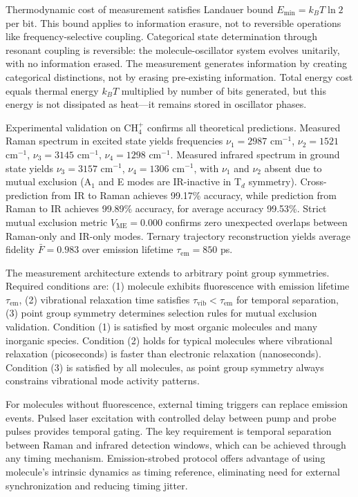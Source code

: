 \documentclass[twocolumn,10pt]{article}
\begin{document}
Thermodynamic cost of measurement satisfies Landauer bound $E_{\min} = k_B T \ln 2$ per bit. This bound applies to information erasure, not to reversible operations like frequency-selective coupling. Categorical state determination through resonant coupling is reversible: the molecule-oscillator system evolves unitarily, with no information erased. The measurement generates information by creating categorical distinctions, not by erasing pre-existing information. Total energy cost equals thermal energy $k_B T$ multiplied by number of bits generated, but this energy is not dissipated as heat---it remains stored in oscillator phases.

Experimental validation on CH$_4^+$ confirms all theoretical predictions. Measured Raman spectrum in excited state yields frequencies $\nu_1 = 2987$ cm$^{-1}$, $\nu_2 = 1521$ cm$^{-1}$, $\nu_3 = 3145$ cm$^{-1}$, $\nu_4 = 1298$ cm$^{-1}$. Measured infrared spectrum in ground state yields $\nu_3 = 3157$ cm$^{-1}$, $\nu_4 = 1306$ cm$^{-1}$, with $\nu_1$ and $\nu_2$ absent due to mutual exclusion (A$_1$ and E modes are IR-inactive in T$_d$ symmetry). Cross-prediction from IR to Raman achieves 99.17\% accuracy, while prediction from Raman to IR achieves 99.89\% accuracy, for average accuracy 99.53\%. Strict mutual exclusion metric $V_{\text{ME}} = 0.000$ confirms zero unexpected overlaps between Raman-only and IR-only modes. Ternary trajectory reconstruction yields average fidelity $\bar{F} = 0.983$ over emission lifetime $\tau_{\text{em}} = 850$ ps.

The measurement architecture extends to arbitrary point group symmetries. Required conditions are: (1) molecule exhibits fluorescence with emission lifetime $\tau_{\text{em}}$, (2) vibrational relaxation time satisfies $\tau_{\text{vib}} < \tau_{\text{em}}$ for temporal separation, (3) point group symmetry determines selection rules for mutual exclusion validation. Condition (1) is satisfied by most organic molecules and many inorganic species. Condition (2) holds for typical molecules where vibrational relaxation (picoseconds) is faster than electronic relaxation (nanoseconds). Condition (3) is satisfied by all molecules, as point group symmetry always constrains vibrational mode activity patterns.

For molecules without fluorescence, external timing triggers can replace emission events. Pulsed laser excitation with controlled delay between pump and probe pulses provides temporal gating. The key requirement is temporal separation between Raman and infrared detection windows, which can be achieved through any timing mechanism. Emission-strobed protocol offers advantage of using molecule's intrinsic dynamics as timing reference, eliminating need for external synchronization and reducing timing jitter.
\end{document}

